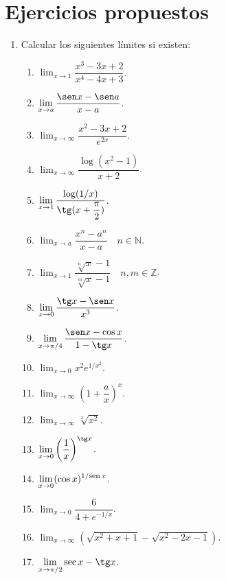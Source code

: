 \section{Ejercicios propuestos}
\begin{enumerate}[leftmargin=*]
\item  Calcular los siguientes límites si existen:
\begin{multicols}{2}
\begin{enumerate}
\item  $\displaystyle \lim_{x\rightarrow 1}\dfrac{x^3-3x+2}{x^4-4x+3}$.
\item  $\displaystyle \lim_{x\rightarrow a}\dfrac{\sen x-\sen a}{x-a}$.
\item $\displaystyle \lim_{x\rightarrow\infty}\dfrac{x^2-3x+2}{e^{2x}}$.
\item $\displaystyle \lim_{x\rightarrow\infty}\dfrac{\log(x^2-1)}{x+2}$.
\item $\displaystyle \lim_{x\rightarrow 1}\dfrac{\log(1/x)}{\tg(x+\dfrac{\pi}{2})}$.
\item $\displaystyle \lim_{x\rightarrow a}\dfrac{x^n-a^n}{x-a}\quad n\in \mathbb{N}$.
\item $ \displaystyle \lim_{x\rightarrow 1}\dfrac{\sqrt[n]{x}-1}{\sqrt[m]{x}-1}\quad n,m \in \mathbb{Z}$.
\item $\displaystyle \lim_{x\rightarrow 0}\dfrac{\tg x-\sen x}{x^3}$.
\item $\displaystyle \lim_{x\rightarrow \pi/4}\dfrac{\sen x-\cos x}{1-\tg x}$.
\item $\displaystyle \lim_{x\rightarrow 0}x^2e^{1/x^2}$.
\item $\displaystyle \lim_{x\rightarrow \infty}\left(1+\dfrac{a}{x}\right)^x$.
\item $\displaystyle \lim_{x\rightarrow \infty} \sqrt[x]{x^2}$.
\item $\displaystyle \lim_{x\rightarrow 0}\left(\dfrac{1}{x}\right)^{\tg x}$.
\item $\displaystyle \lim_{x\rightarrow 0}(\cos x)^{1/\mbox{\footnotesize sen}\, x}$.
\item $\displaystyle \lim_{x\rightarrow 0}\dfrac{6}{4+e^{-1/x}}$.
\item $\displaystyle \lim_{x\rightarrow \infty}\left(\sqrt{x^2+x+1}-\sqrt{x^2-2x-1}\right)$.
\item $\displaystyle \lim_{x\rightarrow \pi/2}\sec x-\tg x$.
\end{enumerate}
\end{multicols}


\end{enumerate}
